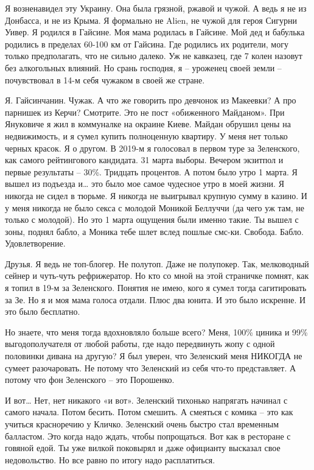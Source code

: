 Я возненавидел эту Украину. Она была грязной, ржавой и чужой. А ведь я не из
Донбасса, и не из Крыма. Я формально не Alien, не чужой для героя Сигурни
Уивер. Я родился в Гайсине. Моя мама родилась в Гайсине. Мой дед и бабулька
родились в пределах 60-100 км от Гайсина. Где родились их родители, могу только
предполагать, что не сильно далеко. Уж не кавказец, где 7 колен назовут без
алкогольных влияний. Но срань господня, я – уроженец своей земли – почувствовал
в 14-м себя чужаком в своей же стране.

Я. Гайсинчанин. Чужак. А что же говорить про девчонок из Макеевки? А про
парнишек из Керчи?  Смотрите. Это не пост «обиженного Майданом». При Януковиче
я жил в коммуналке на окраине Киеве. Майдан обрушил цены на недвижимость, и я
сумел купить полноценную квартиру. У меня нет только черных красок. Я о другом.
В 2019-м я голосовал в первом туре за Зеленского, как самого рейтингового
кандидата. 31 марта выборы. Вечером экзитпол и первые результаты – 30\%.
Тридцать процентов. А потом было утро 1 марта. Я вышел из подъезда и… это было
мое самое чудесное утро в моей жизни. Я никогда не сидел в тюрьме. Я никогда не
выигрывал крупную сумму в казино. И у меня никогда не было секса с молодой
Моникой Беллуччи (да чего уж там, не только с молодой). Но это 1 марта ощущения
были именно такие. Ты вышел с зоны, поднял бабло, а Моника тебе шлет вслед
пошлые смс-ки. Свобода. Бабло. Удовлетворение.

Друзья. Я ведь не топ-блогер. Не полутоп. Даже не полупокер. Так, мелководный сейнер и чуть-чуть рефрижератор. Но кто со мной на этой страничке помнят, как я топил в 19-м за Зеленского. Понятия не имею, кого я сумел тогда сагитировать за Зе. Но я и моя мама голоса отдали. Плюс два юнита. И это было искренне. И это было бесплатно.

Но знаете, что меня тогда вдохновляло больше всего? Меня, 100\% циника и 99\%
выгодополучателя от любой работы, где надо передвинуть жопу с одной половинки
дивана на другую? Я был уверен, что Зеленский меня НИКОГДА не сумеет
разочаровать. Не потому что Зеленский из себя что-то представляет. А потому что
фон Зеленского – это Порошенко.

И вот… Нет, нет никакого «и вот». Зеленский тихонько напрягать начинал с самого
начала. Потом бесить. Потом смешить. А смеяться с комика – это как учиться
красноречию у Кличко. Зеленский очень быстро стал временным балластом. Это
когда надо ждать, чтобы попрощаться. Вот как в ресторане с говяной едой. Ты уже
вилкой поковырял и даже официанту высказал свое недовольство. Но все равно по
итогу надо расплатиться.

